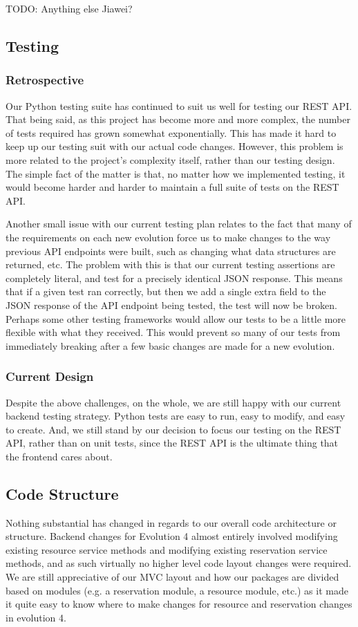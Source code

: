 \documentclass[12pt]{article}
\begin{document}
{\huge TODO: Anything else Jiawei?}

\subsection{Testing}
\subsubsection{Retrospective}
Our Python testing suite has continued to suit us well for testing our REST API. That being said, as this project has become more and more complex, the number of tests required has grown somewhat exponentially. This has made it hard to keep up our testing suit with our actual code changes. However, this problem is more related to the project's complexity itself, rather than our testing design. The simple fact of the matter is that, no matter how we implemented testing, it would become harder and harder to maintain a full suite of tests on the REST API. 

Another small issue with our current testing plan relates to the fact that many of the requirements on each new evolution force us to make changes to the way previous API endpoints were built, such as changing what data structures are returned, etc. The problem with this is that our current testing assertions are completely literal, and test for a precisely identical JSON response. This means that if a given test ran correctly, but then we add a single extra field to the JSON response of the API endpoint being tested, the test will now be broken. Perhaps some other testing frameworks would allow our tests to be a little more flexible with what they received. This would prevent so many of our tests from immediately breaking after a few basic changes are made for a new evolution. 

\subsubsection{Current Design}
Despite the above challenges, on the whole, we are still happy with our current backend testing strategy. Python tests are easy to run, easy to modify, and easy to create. And, we still stand by our decision to focus our testing on the REST API, rather than on unit tests, since the REST API is the ultimate thing that the frontend cares about.

\subsection{Code Structure}
Nothing substantial has changed in regards to our overall code architecture or structure. Backend changes for Evolution 4 almost entirely involved modifying existing resource service methods and modifying existing reservation service methods, and as such virtually no higher level code layout changes were required. We are still appreciative of our MVC layout and how our packages are divided based on modules (e.g. a reservation module, a resource module, etc.) as it made it quite easy to know where to make changes for resource and reservation changes in evolution 4. 
\end{document}

